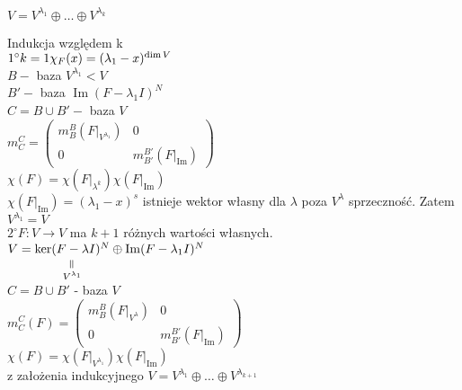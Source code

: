 \begin{wn} $V = V^{\lambda_1} \oplus \ldots \oplus V^{\lambda_k}$ \end{wn}
\begin{dd} 
    Indukcja względem k \\ 
    $1^{\circ} k=1 \\ \chi_F (x) = (\lambda_1 -x )^{\dim V}$ \\ 
    $B - $ baza $V ^{\lambda_1} < V$ \\ 
    $B'  - $ baza $\operatorname{Im} (F - \lambda_1 I)^N$ \\ 
    $C = B \cup B' - $ baza $V$ \\  
    $ m_C^C = \begin{pmatrix} 
        m_B^B(F|_{V^{\lambda_1}}) & 0 \\ 0 & m_{B'}^{B'} (F|_{\operatorname{Im}})
    \end{pmatrix}$ \\ 
    $\chi (F) = \chi(F|_{\lambda^k}) \chi(F|_{\operatorname{Im}})$ \\ 
    $\chi(F|_{\operatorname{Im}}) = (\lambda_1 - x)^s$ istnieje wektor własny dla $\lambda$ poza $V^\lambda$ 
    sprzeczność. Zatem $V^{\lambda_1} = V$ \\ 
    $2^{\circ} F: V \to V$ ma $k+1$ różnych wartości własnych. \\ 
    $ V = \underscript{\ker(F-\lambda I)^N}{\verteq}{V^{\lambda_1}} \oplus \operatorname{Im}(F - \lambda_1 I)^N$ \\ 
    $C = B \cup B'$ - baza $V$  \\ 
    $m_C^C (F) = \begin{pmatrix} m_B^B (F|_{V^\lambda})  &0 \\ 0 & m_{B'}^{B'} (F|_{\operatorname{Im}}) \end{pmatrix}$ \\ 
    $\chi(F) = \chi (F|_{V^{\lambda_1}}) \chi(F|_{\operatorname{Im}})$ \\ 
    z założenia indukcyjnego $V = V^{\lambda_1} \oplus \ldots \oplus V^{\lambda_{k+1}}$
\end{dd} 
